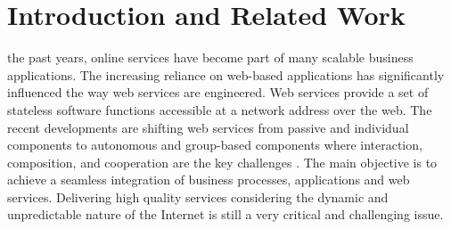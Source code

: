 \documentclass[10pt,journal,cspaper,compsoc]{IEEEtran}
\begin{document}
\maketitle


\IEEEdisplaynotcompsoctitleabstractindextext


%
\IEEEpeerreviewmaketitle



\section{Introduction and Related Work}

 the past years, online services have become part of many
scalable business applications. The increasing reliance on
web-based applications has significantly influenced the way web
services are engineered. Web services provide a set of stateless
software functions accessible at a network address over the web.
The recent developments are shifting web services from passive and
individual components to autonomous and group-based components
where interaction, composition, and cooperation are the key
challenges \cite{ICWS2011-1,SCC2011-1}. The main objective is to
achieve a seamless integration of business processes, applications
and web services. Delivering high quality services considering the
dynamic and unpredictable nature of the Internet is still a very
critical and challenging issue.
\end{document}
